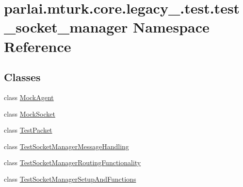 \hypertarget{namespaceparlai_1_1mturk_1_1core_1_1legacy__2018_1_1test_1_1test__socket__manager}{}\section{parlai.\+mturk.\+core.\+legacy\+\_.\+test.\+test\+\_\+socket\+\_\+manager Namespace Reference}
\label{namespaceparlai_1_1mturk_1_1core_1_1legacy__2018_1_1test_1_1test__socket__manager}
\subsection*{Classes}
\begin{DoxyCompactItemize}
\item 
class \hyperlink{classparlai_1_1mturk_1_1core_1_1legacy__2018_1_1test_1_1test__socket__manager_1_1MockAgent}{Mock\+Agent}
\item 
class \hyperlink{classparlai_1_1mturk_1_1core_1_1legacy__2018_1_1test_1_1test__socket__manager_1_1MockSocket}{Mock\+Socket}
\item 
class \hyperlink{classparlai_1_1mturk_1_1core_1_1legacy__2018_1_1test_1_1test__socket__manager_1_1TestPacket}{Test\+Packet}
\item 
class \hyperlink{classparlai_1_1mturk_1_1core_1_1legacy__2018_1_1test_1_1test__socket__manager_1_1TestSocketManagerMessageHandling}{Test\+Socket\+Manager\+Message\+Handling}
\item 
class \hyperlink{classparlai_1_1mturk_1_1core_1_1legacy__2018_1_1test_1_1test__socket__manager_1_1TestSocketManagerRoutingFunctionality}{Test\+Socket\+Manager\+Routing\+Functionality}
\item 
class \hyperlink{classparlai_1_1mturk_1_1core_1_1legacy__2018_1_1test_1_1test__socket__manager_1_1TestSocketManagerSetupAndFunctions}{Test\+Socket\+Manager\+Setup\+And\+Functions}
\end{DoxyCompactItemize}
